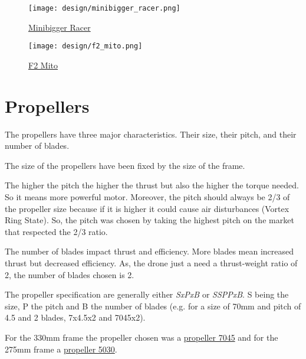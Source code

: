         \begin{figure}[!ht]
            \centering
            \texttt{[image: design/minibigger\_racer.png]}
            \caption{\href{https://www.banggood.com/Minibigger-Racer-255mm-275mm-Carbon-Fiber-4mm-Arm-RC-Drone-FPV-Racing-Frame-Kit-with-Wrench-Tools-p-1241634.html?rmmds=search&ID=228532758&cur_warehouse=CN}{Minibigger Racer}}
            \label{fig:minibiggerracer}
        \end{figure}
        
        \begin{figure}[!ht]
            \centering
            \texttt{[image: design/f2\_mito.png]}
            \caption{\href{https://www.banggood.com/F2-Mito-GS-Carbon-Fiber-195220250275mm-Freestyle-Stretch-X-Frame-Kit-for-RC-FPV-Racing-Drone-p-1319168.html?rmmds=search&ID=532758&cur_warehouse=CN}{F2 Mito}}
            \label{fig:f2mito}
        \end{figure}
    
    \section{Propellers}
        The propellers have three major characteristics. Their size, their pitch, and their number of blades.
        
        The size of the propellers have been fixed by the size of the frame.
        
        The higher the pitch the higher the thrust but also the higher the torque needed. So it means more powerful motor. Moreover, the pitch should always be 2/3 of the propeller size because if it is higher it could cause air disturbances (Vortex Ring State). So, the pitch was chosen by taking the highest pitch on the market that respected the 2/3 ratio.
        
        The number of blades impact thrust and efficiency. More blades mean increased thrust but decreased efficiency. As, the drone just a need a thrust-weight ratio of 2, the number of blades chosen is 2.
        
        The propeller specification are generally either \emph{SxPxB} or \emph{SSPPxB}. S being the size, P the pitch and B the number of blades (e.g. for a size of 70mm and pitch of 4.5 and 2 blades, 7x4.5x2 and 7045x2).
        
        For the 330mm frame the propeller chosen was a \hyperref[fig:7045]{propeller 7045} and for the 275mm frame a \hyperref[fig:5030]{propeller 5030}.
    
